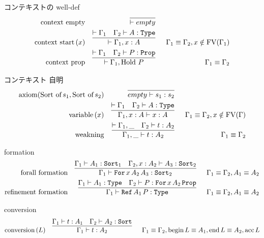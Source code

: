\begin{itembox}[l]{コンテキストの well-def}
\begin{align*}
  \text{context empty} &&
  \infer[]{\vdash empty}{} \\
  \text{context start} \, (x) &&
  \infer[]{
    \vdash \Gamma_1 , x : A}{\vdash \Gamma_1 & \Gamma_2 \vdash A : \texttt{Type}
  } && \Gamma_1 \equiv \Gamma_2 , x \notin \text{FV}(\Gamma_1) \\
  \text{context prop} &&
  \infer[]{
    \vdash \Gamma_1 , \text{Hold } P}{\vdash \Gamma_1 & \Gamma_2 \vdash P : \texttt{Prop}
  } && \Gamma_1 \equiv \Gamma_2
\end{align*}
\end{itembox}

\begin{itembox}[l]{コンテキスト 自明}
\begin{align*}
  \text{axiom} (\text{Sort of} \, s_1 , \text{Sort of} \, s_2) &&
  \infer[]{empty \vdash s_1 : s_2}{} \\
  \text{variable} \, (x) &&
  \infer[]{
    \Gamma_1 , x : A \vdash x : A}{\vdash \Gamma_1 & \Gamma_2 \vdash A : \texttt{Type}
  } && \Gamma_1 \equiv \Gamma_2 , x \notin \text{FV}(\Gamma) \\
  \text{weakning} &&
  \infer[]{
    \Gamma_1 , \_ \vdash t : A_2}{\vdash \Gamma_1 , \_ & \Gamma_2 \vdash t : A_2
  } && \Gamma_1 \equiv \Gamma_2 
\end{align*}
\end{itembox}

\begin{itembox}[l]{formation}
\begin{align*}
  \text{forall formation} &&
  \infer[]{
    \Gamma_1 \vdash \texttt{For} \, x \, A_2 \, A_3 : \texttt{Sort}_2}{\Gamma_1 \vdash A_1 : \texttt{Sort}_1 & \Gamma_2 , x : A_2 \vdash A_3 : \texttt{Sort}_2
  } && \Gamma_1 \equiv \Gamma_2 , A_1 \equiv A_2 \\
  \text{refinement formation} &&
  \infer[]{
    \Gamma_1 \vdash \texttt{Ref} \, A_1 \, P : \texttt{Type}}{\Gamma_1 \vdash A_1 : \texttt{Type} & \Gamma_2 \vdash P : \texttt{For} \, x \, A_2 \, \texttt{Prop}
  } && \Gamma_1 \equiv \Gamma_2 , A_1 \equiv A_2
\end{align*}
\end{itembox}

\begin{itembox}[l]{conversion}
\begin{align*}
  \text{conversion} \, (L) &&
  \infer[]{
    \Gamma_1 \vdash t : A_2}{\Gamma_1 \vdash t : A_1 & \Gamma_2 \vdash A_2 : \texttt{Sort}
  } && \Gamma_1 \equiv \Gamma_2 , \text{begin} \, L \equiv A_1 , \text{end} \, L \equiv A_2 , \text{acc} \, L
\end{align*}
\end{itembox}

